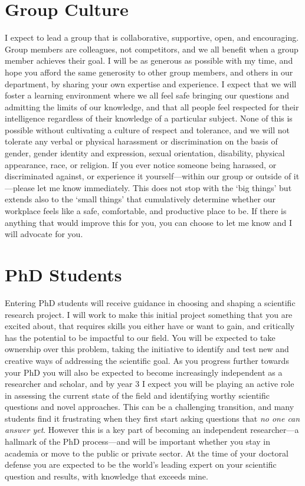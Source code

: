 \documentclass{classassignments}
\begin{document}
\section{Group Culture}
I expect to lead a group that is collaborative, supportive, open, and encouraging. Group members are colleagues, not competitors, and we all benefit when a group member achieves their goal. I will be as generous as possible with my time, and hope you afford the same generosity to other group members, and others in our department, by sharing your own expertise and experience. I expect that we will foster a learning environment where we all feel safe bringing our questions and admitting the limits of our knowledge, and that all people feel respected for their intelligence regardless of their knowledge of a particular subject. None of this is possible without cultivating a culture of respect and tolerance, and we will not tolerate any verbal or physical harassment or discrimination on the basis of gender, gender identity and expression, sexual orientation, disability, physical appearance, race, or religion. If you ever notice someone being harassed, or discriminated against, or experience it yourself---within our group or outside of it---please let me know immediately. This does not stop with the `big things' but extends also to the `small things' that cumulatively determine whether our workplace feels like a safe, comfortable, and productive place to be. If there is anything that would improve this for you, you can choose to let me know and I will advocate for you.




\section{PhD Students}
Entering PhD students will receive guidance in choosing and shaping a scientific research project. I will work to make this initial project something that you are excited about, that requires skills you either have or want to gain, and critically has the potential to be impactful to our field. You will be expected to take ownership over this problem, taking the initiative to identify and test new and creative ways of addressing the scientific goal. As you progress further towards your PhD you will also be expected to become increasingly independent as a researcher and scholar, and by year 3 I expect you will be playing an active role in assessing the current state of the field and identifying worthy scientific questions and novel approaches. This can be a challenging transition, and many students find it frustrating when they first start asking questions that \textit{no one can answer yet}. However this is a key part of becoming an independent researcher---a hallmark of the PhD process---and will be important whether you stay in academia or move to the public or private sector. At the time of your doctoral defense you are expected to be the world's leading expert on your scientific question and results, with knowledge that exceeds mine. 
\end{document}
